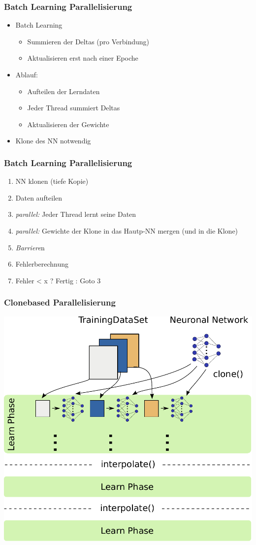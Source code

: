 \documentclass[18pt]{beamer}
\begin{document}
	\begin{frame}[c]\frametitle{Batch Learning Parallelisierung}
		\begin{itemize}
			\item Batch Learning
			\begin{itemize}
				\item Summieren der Deltas (pro Verbindung)
				\item Aktualisieren erst nach einer Epoche
			\end{itemize}
			\item Ablauf:
			\begin{itemize}
				\item Aufteilen der Lerndaten
				\item Jeder Thread summiert Deltas
				\item Aktualisieren der Gewichte
			\end{itemize}
			\item Klone des NN notwendig
		\end{itemize}
	\end{frame}
	
	\begin{frame}[t]\frametitle{Batch Learning Parallelisierung}
		\begin{enumerate}
			\item NN klonen (tiefe Kopie)
			\item Daten aufteilen
			\item \textit{parallel:} Jeder Thread lernt seine Daten
			\item \textit{parallel:} Gewichte der Klone in das Hautp-NN mergen (und in die Klone)
			\item \textit{Barriere}n
			\item Fehlerberechnung
			\item Fehler < x ? Fertig : Goto 3
		\end{enumerate}
	\end{frame}
	
	\begin{frame}[t]\frametitle{Clonebased Parallelisierung}
		\begin{center}
			\includegraphics[width=.65\textwidth]{images/Parallelisierungsansatz.pdf} 
		\end{center}
	\end{frame}
	
\end{document}

